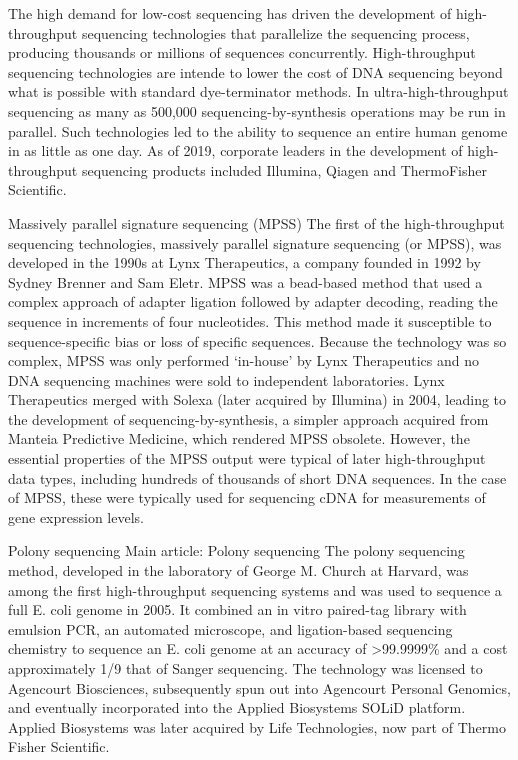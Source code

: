 The high demand for low-cost sequencing has driven the development of high-throughput sequencing technologies that parallelize the sequencing process, producing thousands or millions of sequences concurrently. High-throughput sequencing technologies are intende to lower the cost of DNA sequencing beyond what is possible with standard dye-terminator methods. In ultra-high-throughput sequencing as many as 500,000 sequencing-by-synthesis operations may be run in parallel. Such technologies led to the ability to sequence an entire human genome in as little as one day. As of 2019, corporate leaders in the development of high-throughput sequencing products included Illumina, Qiagen and ThermoFisher Scientific.

Massively parallel signature sequencing (MPSS)
The first of the high-throughput sequencing technologies, massively parallel signature sequencing (or MPSS), was developed in the 1990s at Lynx Therapeutics, a company founded in 1992 by Sydney Brenner and Sam Eletr. MPSS was a bead-based method that used a complex approach of adapter ligation followed by adapter decoding, reading the sequence in increments of four nucleotides. This method made it susceptible to sequence-specific bias or loss of specific sequences. Because the technology was so complex, MPSS was only performed `in-house' by Lynx Therapeutics and no DNA sequencing machines were sold to independent laboratories. Lynx Therapeutics merged with Solexa (later acquired by Illumina) in 2004, leading to the development of sequencing-by-synthesis, a simpler approach acquired from Manteia Predictive Medicine, which rendered MPSS obsolete. However, the essential properties of the MPSS output were typical of later high-throughput data types, including hundreds of thousands of short DNA sequences. In the case of MPSS, these were typically used for sequencing cDNA for measurements of gene expression levels.

Polony sequencing
Main article: Polony sequencing
The polony sequencing method, developed in the laboratory of George M. Church at Harvard, was among the first high-throughput sequencing systems and was used to sequence a full E. coli genome in 2005. It combined an in vitro paired-tag library with emulsion PCR, an automated microscope, and ligation-based sequencing chemistry to sequence an E. coli genome at an accuracy of \textgreater{}99.9999\% and a cost approximately 1/9 that of Sanger sequencing. The technology was licensed to Agencourt Biosciences, subsequently spun out into Agencourt Personal Genomics, and eventually incorporated into the Applied Biosystems SOLiD platform. Applied Biosystems was later acquired by Life Technologies, now part of Thermo Fisher Scientific.

